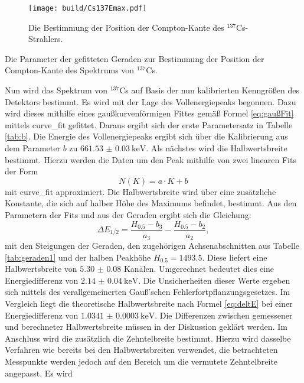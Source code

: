 \begin{figure}
	\centering
	\texttt{[image: build/Cs137Emax.pdf]}
	\caption{Die Bestimmung der Position der Compton-Kante des $^{137}$Cs-Strahlers.}
	\label{fig:Emax}
\end{figure}
\begin{table}
	\centering
	\caption{Die Parameter der gefitteten Geraden zur Bestimmung der Position der Compton-Kante des Spektrums von $^{137}$Cs.}
	
\end{table}
Nun wird das Spektrum von $^{137}$Cs auf Basis der nun kalibrierten Kenngrößen des Detektors bestimmt. Es wird mit der Lage des Vollenergiepeaks begonnen. Dazu wird dieses mithilfe eines gaußkurvenförmigen Fittes gemäß Formel \eqref{eq:gaußFit} mittels curve\_fit \cite{scipy} gefittet. Daraus ergibt sich der erste Parametersatz in Tabelle \ref{tab:b}.
Die Energie des Vollenergiepeaks ergibt sich über die Kalibrierung aus dem Parameter $b$ zu $\SI{661.53(3)}{\kilo\electronvolt}$.
Als nächstes wird die Halbwertsbreite bestimmt. Hierzu werden die Daten um den Peak mithilfe von zwei linearen Fits der Form
\begin{equation}
	N(K)=a \cdot K + b \label{eq:geradeKN}
\end{equation}
mit curve\_fit \cite{scipy} approximiert. Die Halbwertsbreite wird über eine zusätzliche Konstante, die sich auf halber Höhe des Maximums befindet, bestimmt. Aus den Parametern der Fits und aus der Geraden ergibt sich die Gleichung:
\begin{equation}
    \Delta E_\text{1/2} = \frac{H_{0.5}-b_3}{a_3} - \frac{H_{0.5}-b_2}{a_2}, \label{eq:Z}
\end{equation}
mit den Steigungen der Geraden, den zugehörigen Achsenabschnitten aus Tabelle \ref{tab:geraden1} und der halben Peakhöhe $H_{0.5}=\num{1493.5}$. Diese liefert eine Halbwertsbreite von $\num{5.30(8)}$ Kanälen. Umgerechnet bedeutet dies eine Energiedifferenz von $\SI{2.14(4)}{\kilo\electronvolt}$. Die Unsicherheiten dieser Werte ergeben sich mittels des verallgemeinerten Gauß’schen Fehlerfortpflanzungsgesetzes.
Im Vergleich liegt die theoretische Halbwertsbreite nach Formel \eqref{eq:deltE} bei einer Energiedifferenz von $\SI{1.0341(3)}{\kilo\electronvolt}$. Die Differenzen zwischen gemessener und berechneter Halbwertsbreite müssen in der Diskussion geklärt werden. 
Im Anschluss wird die zusätzlich die Zehntelbreite bestimmt. Hierzu wird dasselbe Verfahren wie bereits bei den Halbwertsbreiten verwendet, die betrachteten Messpunkte werden jedoch auf den Bereich um die vermutete Zehntelbreite angepasst. Es wird
